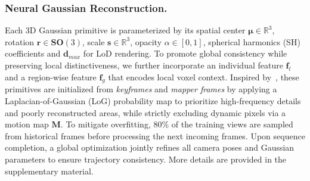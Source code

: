 \subsubsection{Neural Gaussian Reconstruction.} Each 3D Gaussian primitive is parameterized by its spatial center $\boldsymbol{\mu} \in \mathbb{R}^3$, rotation $\mathbf{r} \in \mathbf{SO}(3)$, scale $\mathbf{s} \in \mathbb{R}^3$, opacity $\alpha \in [0, 1]$, spherical harmonics (SH) coefficients and $\mathbf{d}_{max}$ for LoD rendering. To promote global consistency while preserving local distinctiveness, we further incorporate an individual feature $\mathbf{f}_l$ and a region-wise feature $\mathbf{f}_g$ that encodes local voxel context. Inspired by~\cite{meuleman2025fly, artdeco}, these primitives are initialized from \emph{keyframes} and \emph{mapper frames} by applying a Laplacian-of-Gaussian (LoG) probability map to prioritize high-frequency details and poorly reconstructed areas, while strictly excluding dynamic pixels via a motion map $\mathbf{M}$.
To mitigate overfitting, 80\% of the training views are sampled from historical frames before processing the next incoming frames. Upon sequence completion, a global optimization jointly refines all camera poses and Gaussian parameters to ensure trajectory consistency. More details are provided in the supplementary material. 




